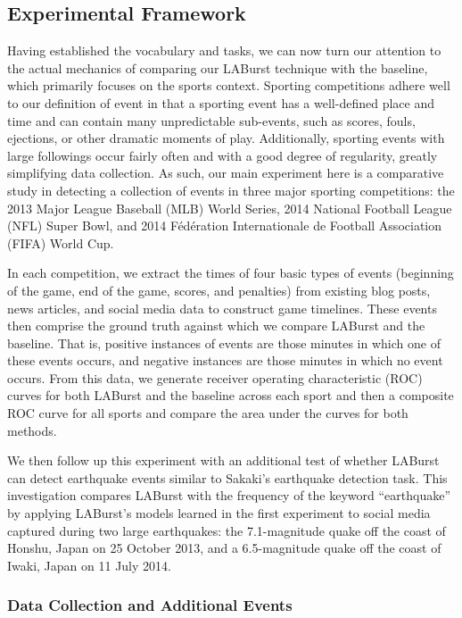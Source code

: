 \documentclass{acm_proc_article-sp}
\begin{document}
\subsection{Experimental Framework}

Having established the vocabulary and tasks, we can now turn our attention to the actual mechanics of comparing our LABurst technique with the baseline, which primarily focuses on the sports context.
Sporting competitions adhere well to our definition of event in that a sporting event has a well-defined place and time and can contain many unpredictable sub-events, such as scores, fouls, ejections, or other dramatic moments of play.
Additionally, sporting events with large followings occur fairly often and with a good degree of regularity, greatly simplifying data collection.
As such, our main experiment here is a comparative study in detecting a collection of events in three major sporting competitions: the 2013 Major League Baseball (MLB) World Series, 2014 National Football League (NFL) Super Bowl, and 2014 F\'{e}d\'{e}ration Internationale de Football Association (FIFA) World Cup.

In each competition, we extract the times of four basic types of events (beginning of the game, end of the game, scores, and penalties) from existing blog posts, news articles, and social media data to construct game timelines.
These events then comprise the ground truth against which we compare LABurst and the baseline.
That is, positive instances of events are those minutes in which one of these events occurs, and negative instances are those minutes in which no event occurs.
From this data, we generate receiver operating characteristic (ROC) curves for both LABurst and the baseline across each sport and then a composite ROC curve for all sports and compare the area under the curves for both methods.

We then follow up this experiment with an additional test of whether LABurst can detect earthquake events similar to Sakaki's earthquake detection task.
This investigation compares LABurst with the frequency of the keyword ``earthquake'' by applying LABurst's models learned in the first experiment to social media captured during two large earthquakes: the 7.1-magnitude quake off the coast of Honshu, Japan on 25 October 2013, and a 6.5-magnitude quake off the coast of Iwaki, Japan on 11 July 2014.

\subsubsection{Data Collection and Additional Events}
\end{document}
